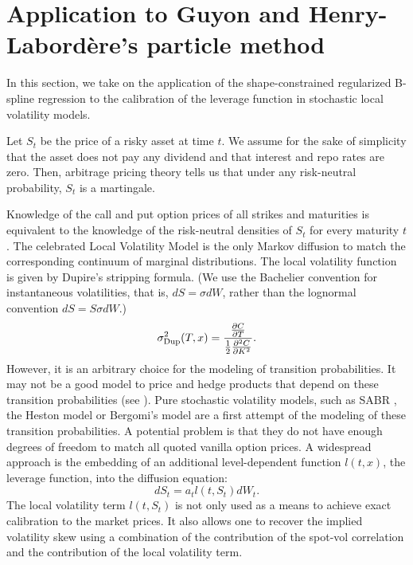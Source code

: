 \documentclass[a4paper]{article}
\newcommand{\1}{\textbf{1}}
\begin{document}
\section{Application to Guyon and Henry-Labordère's particle method}\label{sec:particle_method}
\par In this section, we take on the application of the shape-constrained regularized B-spline regression to the calibration of the leverage function in stochastic local volatility models.
\par Let $S_t$ be the price of a risky asset at time $t$. We assume for the sake of simplicity that the asset does not pay any dividend and that interest and repo rates are zero. Then, arbitrage pricing theory tells us that under any risk-neutral probability, $S_t$ is a martingale. 
\par Knowledge of the call and put option prices of all strikes and maturities is equivalent to the knowledge of the risk-neutral densities of $S_t$ for every maturity $t$. The celebrated Local Volatility Model \cite{DupirePricingSmile} is the only Markov diffusion to match the corresponding continuum of marginal distributions. The local volatility function is given by Dupire's stripping formula. (We use the Bachelier convention for instantaneous volatilities, that is, $dS = \sigma dW$, rather than the lognormal convention $dS = S \sigma dW$.)
\begin{equation}\label{eq:stripping_form}
\sigma_{\textnormal{Dup}}^2(T, x) = \frac{\frac{\partial C}{\partial T}}{\frac{1}{2} \frac{\partial^2 C}{\partial K^2}}.
\end{equation}
However, it is an arbitrary choice for the modeling of transition probabilities. It may not be a good model to price and hedge products that depend on these transition probabilities (see \cite{DupireUTV}). Pure stochastic volatility models, such as SABR \cite{SABRSmallMaturity}, the Heston model \cite{HestonModel} or Bergomi's model \cite{SmileDynamics2} are a first attempt of the modeling of these transition probabilities. A potential problem is that they do not have enough degrees of freedom to match all quoted vanilla option prices. A widespread approach \cite{RenMadanQianQian} is the embedding of an additional level-dependent function $l(t,x)$, the leverage function, into the diffusion equation: 
\begin{equation}\label{eq:slv_sde}
dS_t = a_t l(t, S_t) dW_t.
\end{equation}
The local volatility term $l(t,S_t)$ is not only used as a means to achieve exact calibration to the market prices. It also allows one to recover the implied volatility skew using a combination of the contribution of the spot-vol correlation and the contribution of the local volatility term.
\end{document}
